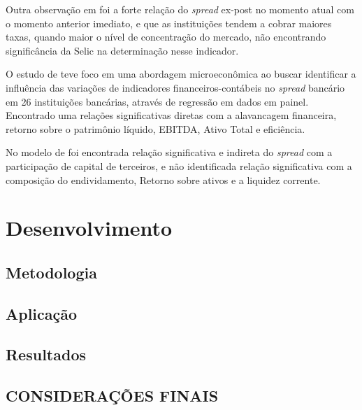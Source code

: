 \documentclass[12pt,openright,oneside,a4paper,chapter=TITLE,section=TITLE,subsection=Title,english,french,spanish,portugues,sumario=tradicional]{04-class-files/abntex2}
\begin{document}
Outra observação em \textcite{dantas:2012} foi a forte relação do \emph{spread} ex-post no momento atual com o momento anterior imediato, e que as instituições tendem a cobrar maiores taxas, quando maior o nível de concentração do mercado, não encontrando significância da Selic na determinação nesse indicador.

O estudo de \textcite{timotio:2018} teve foco em uma abordagem microeconômica ao buscar identificar a influência das variações de indicadores financeiros-contábeis no \emph{spread} bancário em 26 instituições bancárias, através de regressão em dados em painel. Encontrado uma relações significativas diretas com a alavancagem financeira, retorno sobre o patrimônio líquido, EBITDA, Ativo Total e eficiência.

No modelo de \textcite{timotio:2018} foi encontrada relação significativa e indireta do \emph{spread} com a participação de capital de terceiros, e não identificada relação significativa com a composição do endividamento, Retorno sobre ativos e a liquidez corrente.

\part{Desenvolvimento}

\chapter{Metodologia}

\chapter{Aplicação}

\chapter{Resultados}


\chapter*[Conclusão]{CONSIDERAÇÕES FINAIS}

\postextual


\SingleSpacing

\printbibliography
\end{document}
